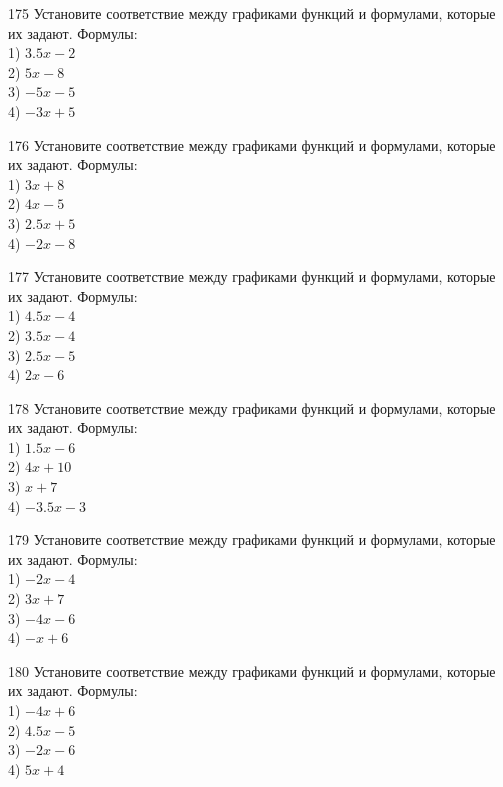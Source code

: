 \documentclass[4apaper]{article}
\begin{document}
\begin{taskBN}{175}
Установите соответствие между графиками функций и формулами, которые их задают. Формулы: \\1) $3.5x-2$\\2) $5x-8$\\3) $-5x-5$\\4) $-3x+5$
\end{taskBN}

\begin{taskBN}{176}
Установите соответствие между графиками функций и формулами, которые их задают. Формулы: \\1) $3x+8$\\2) $4x-5$\\3) $2.5x+5$\\4) $-2x-8$
\end{taskBN}

\begin{taskBN}{177}
Установите соответствие между графиками функций и формулами, которые их задают. Формулы: \\1) $4.5x-4$\\2) $3.5x-4$\\3) $2.5x-5$\\4) $2x-6$
\end{taskBN}

\begin{taskBN}{178}
Установите соответствие между графиками функций и формулами, которые их задают. Формулы: \\1) $1.5x-6$\\2) $4x+10$\\3) $x+7$\\4) $-3.5x-3$
\end{taskBN}

\begin{taskBN}{179}
Установите соответствие между графиками функций и формулами, которые их задают. Формулы: \\1) $-2x-4$\\2) $3x+7$\\3) $-4x-6$\\4) $-x+6$
\end{taskBN}

\begin{taskBN}{180}
Установите соответствие между графиками функций и формулами, которые их задают. Формулы: \\1) $-4x+6$\\2) $4.5x-5$\\3) $-2x-6$\\4) $5x+4$
\end{taskBN}
\end{document}

